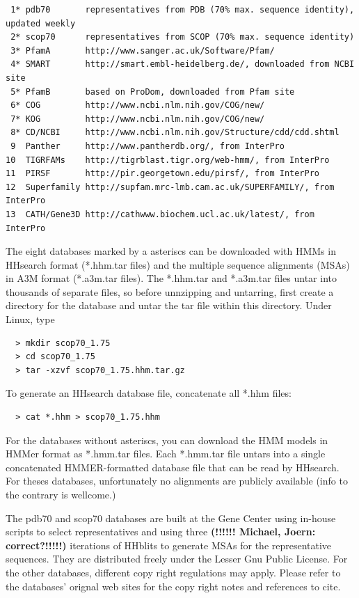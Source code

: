 \documentclass[11pt,a4paper]{article}
\begin{document}
\small 
\begin{verbatim}
 1* pdb70       representatives from PDB (70% max. sequence identity), updated weekly
 2* scop70      representatives from SCOP (70% max. sequence identity)
 3* PfamA       http://www.sanger.ac.uk/Software/Pfam/
 4* SMART       http://smart.embl-heidelberg.de/, downloaded from NCBI site
 5* PfamB       based on ProDom, downloaded from Pfam site
 6* COG         http://www.ncbi.nlm.nih.gov/COG/new/
 7* KOG	        http://www.ncbi.nlm.nih.gov/COG/new/
 8* CD/NCBI     http://www.ncbi.nlm.nih.gov/Structure/cdd/cdd.shtml
 9  Panther     http://www.pantherdb.org/, from InterPro
10  TIGRFAMs    http://tigrblast.tigr.org/web-hmm/, from InterPro
11  PIRSF       http://pir.georgetown.edu/pirsf/, from InterPro
12  Superfamily http://supfam.mrc-lmb.cam.ac.uk/SUPERFAMILY/, from InterPro
13  CATH/Gene3D http://cathwww.biochem.ucl.ac.uk/latest/, from InterPro 
\end{verbatim} 
\normalsize

The eight databases marked by a asteriscs can be downloaded with HMMs in HHsearch 
format (*.hhm.tar files) and the multiple sequence alignments (MSAs) in 
A3M format (*.a3m.tar files).  The *.hhm.tar and *.a3m.tar files untar into thousands
of separate files, so before unnzipping and untarring, first create a directory for 
the database and untar the tar file within this directory. Under Linux, type
\begin{verbatim}
  > mkdir scop70_1.75
  > cd scop70_1.75
  > tar -xzvf scop70_1.75.hhm.tar.gz
\end{verbatim}

To generate an HHsearch database file, concatenate all *.hhm files:
\begin{verbatim}
  > cat *.hhm > scop70_1.75.hhm
\end{verbatim}
For the databases without asteriscs, you can download the HMM models in HMMer format as 
*.hmm.tar files. Each *.hmm.tar file untars into a single concatenated HMMER-formatted 
database file that can be read by HHsearch. For theses databases, unfortunately no 
alignments are publicly available (info to the contrary is wellcome.) 

The pdb70 and scop70 databases are built at the Gene Center using in-house scripts 
to select representatives and using three {\bf (!!!!!! Michael, Joern: correct?!!!!!)}
iterations of HHblits to generate MSAs for the representative 
sequences. They are distributed freely under the Lesser Gnu Public License. 
For the other databases, different copy right regulations may apply. 
Please refer to the databases' orignal web sites for the copy right notes and references to 
cite.
\end{document}
